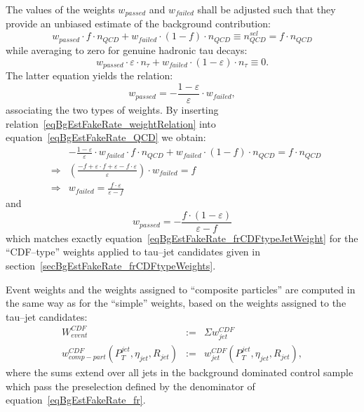 The values of the weights $w_{passed}$ and $w_{failed}$ shall be adjusted such
that they provide an unbiased estimate of the background contribution:
\begin{equation}
w_{passed} \cdot f \cdot n_{QCD} + w_{failed} \cdot \left( 1 - f \right) \cdot n_{QCD} \equiv n_{QCD}^{sel} = f \cdot n_{QCD}
\label{eqBgEstFakeRate_QCD}
\end{equation}
while averaging to zero for genuine hadronic tau decays:
\begin{equation*}
w_{passed} \cdot \varepsilon \cdot n_{\tau} + w_{failed} \cdot \left( 1 - \varepsilon \right) \cdot n_{\tau} \equiv 0.
\label{eqBgEstFakeRate_tau}
\end{equation*}
The latter equation yields the relation:
\begin{equation}
w_{passed} = -\frac{1 - \varepsilon}{\varepsilon} \cdot w_{failed},
\label{eqBgEstFakeRate_weightRelation}
\end{equation}
associating the two types of weights.  By inserting
relation~\ref{eqBgEstFakeRate_weightRelation} into
equation~\ref{eqBgEstFakeRate_QCD} we obtain:
\begin{eqnarray*}
& & -\frac{1 - \varepsilon}{\varepsilon} \cdot w_{failed} \cdot f \cdot n_{QCD} + w_{failed} \cdot \left( 1 - f \right) \cdot n_{QCD} 
 = f \cdot n_{QCD} \\
& \Rightarrow & \left( \frac{-f + \varepsilon \cdot f + \varepsilon - f \cdot \varepsilon}{\varepsilon} \right) \cdot w_{failed} = f \\
& \Rightarrow & w_{failed} = \frac{f \cdot \varepsilon}{\varepsilon - f} 
\end{eqnarray*}
and 
\begin{equation}
w_{passed} = -\frac{f \cdot \left( 1 - \varepsilon \right)}{\varepsilon - f}
\end{equation}
which matches exactly equation~\ref{eqBgEstFakeRate_frCDFtypeJetWeight} 
for the ``CDF--type'' weights applied to tau--jet candidates given in section~\ref{secBgEstFakeRate_frCDFtypeWeights}.


Event weights and the weights assigned to ``composite particles'' 
are computed in the same way as for the ``simple'' weights,
based on the weights assigned to the tau--jet candidates:
\begin{eqnarray}
W_{event}^{CDF} & := & \Sigma w_{jet}^{CDF} \nonumber \\
w_{comp-part}^{CDF} \left( P_{T}^{jet}, \eta_{jet}, R_{jet} \right) & := & 
  w_{jet}^{CDF} \left( P_{T}^{jet}, \eta_{jet}, R_{jet} \right),
\label{eqBgEstFakeRate_frCDFtypeEvent_and_CompositeParticleWeight}
\end{eqnarray}
where the sums extend over all jets in the background dominated control sample
which pass the preselection defined by the denominator of
equation~\ref{eqBgEstFakeRate_fr}.

